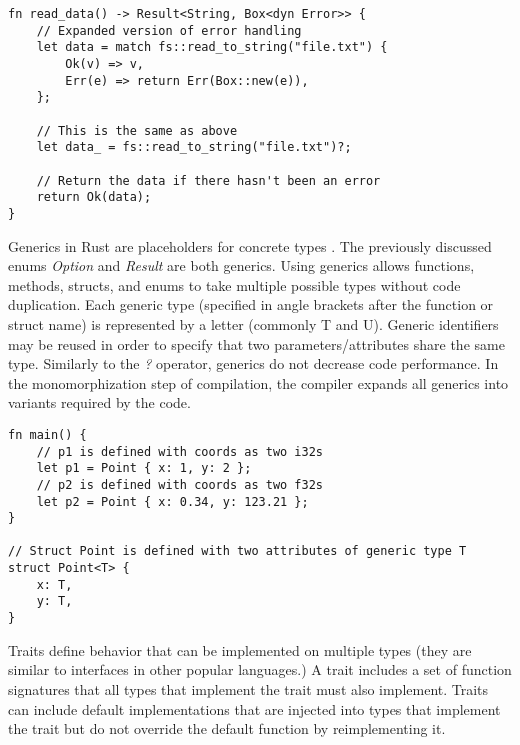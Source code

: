 \documentclass[12pt]{article}
\begin{document}
\singlespacing{}
\begin{verbatim}
fn read_data() -> Result<String, Box<dyn Error>> {
    // Expanded version of error handling
    let data = match fs::read_to_string("file.txt") {
        Ok(v) => v,
        Err(e) => return Err(Box::new(e)),
    };

    // This is the same as above
    let data_ = fs::read_to_string("file.txt")?;

    // Return the data if there hasn't been an error
    return Ok(data);
}
\end{verbatim}
\doublespacing{}

Generics in Rust are placeholders for concrete types \cite{rust-by-example}.
The previously discussed enums \textit{Option} and \textit{Result} are both
generics. Using generics allows functions, methods, structs, and enums to take
multiple possible types without code duplication. Each generic type (specified
in angle brackets after the function or struct name) is represented by a letter
(commonly T and U). Generic identifiers may be reused in order to specify that
two parameters/attributes share the same type. Similarly to the \textit{?}
operator, generics do not decrease code performance. In the monomorphization
step of compilation, the compiler expands all generics into variants required
by the code.

\singlespacing{}
\begin{verbatim}
fn main() {
    // p1 is defined with coords as two i32s
    let p1 = Point { x: 1, y: 2 };
    // p2 is defined with coords as two f32s
    let p2 = Point { x: 0.34, y: 123.21 };
}

// Struct Point is defined with two attributes of generic type T
struct Point<T> {
    x: T,
    y: T,
}
\end{verbatim}
\doublespacing{}

Traits define behavior that can be implemented on multiple types (they are
similar to interfaces in other popular languages.) A trait includes a set of
function signatures that all types that implement the trait must also
implement. Traits can include default implementations that are injected into
types that implement the trait but do not override the default function by
reimplementing it.
\end{document}
